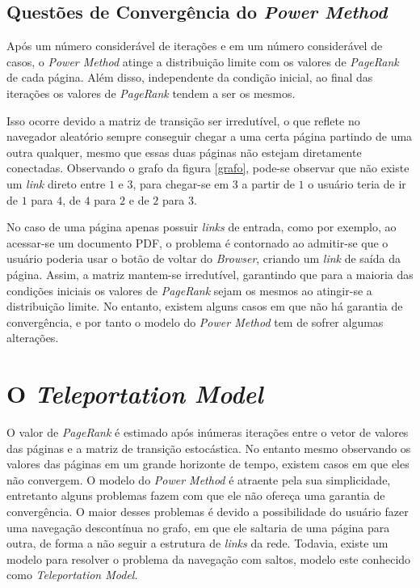 \subsection{Questões de Convergência do \textit{Power Method}}%

Após um número considerável de iterações e em um número considerável de casos, o \textit{Power Method} atinge a distribuição limite com os valores de \textit{PageRank} de cada página. Além disso, independente da condição inicial, ao final das iterações os valores de \textit{PageRank} tendem a ser os mesmos.

Isso ocorre devido a matriz de transição ser irredutível, o que reflete no navegador aleatório sempre conseguir chegar a uma certa página partindo de uma outra qualquer, mesmo que essas duas páginas não estejam diretamente conectadas. Observando o grafo da figura \ref{grafo}, pode-se observar que não existe um \textit{link} direto entre $1$ e $3$, para chegar-se em $3$ a partir de $1$ o usuário teria de ir de $1$ para $4$, de $4$ para $2$ e de $2$ para $3$.

No caso de uma página apenas possuir \textit{links} de entrada, como por exemplo, ao acessar-se um documento PDF, o problema é contornado ao admitir-se que o usuário poderia usar o botão de voltar do \textit{Browser}, criando um \textit{link} de saída da página. Assim, a matriz mantem-se irredutível, garantindo que para a maioria das condições iniciais os valores de \textit{PageRank} sejam os mesmos ao atingir-se a distribuição limite. No entanto, existem alguns casos em que não há garantia de convergência, e por tanto o modelo do \textit{Power Method} tem de sofrer algumas alterações. 


\section{O \textit{Teleportation Model}}%

O valor de \textit{PageRank} é estimado após inúmeras iterações entre o vetor de valores das páginas e a matriz de transição estocástica. No entanto mesmo observando os valores das páginas em um grande horizonte de tempo, existem casos em que eles não convergem. O modelo do \textit{Power Method} é atraente pela sua simplicidade, entretanto alguns problemas fazem com que ele não ofereça uma garantia de convergência. O maior desses problemas é devido a possibilidade do usuário fazer uma navegação descontínua no grafo, em que ele saltaria de uma página para outra, de forma a não seguir a estrutura de \textit{links} da rede. Todavia, existe um modelo para resolver o problema da navegação com saltos, modelo este conhecido como \textit{Teleportation Model}. 

